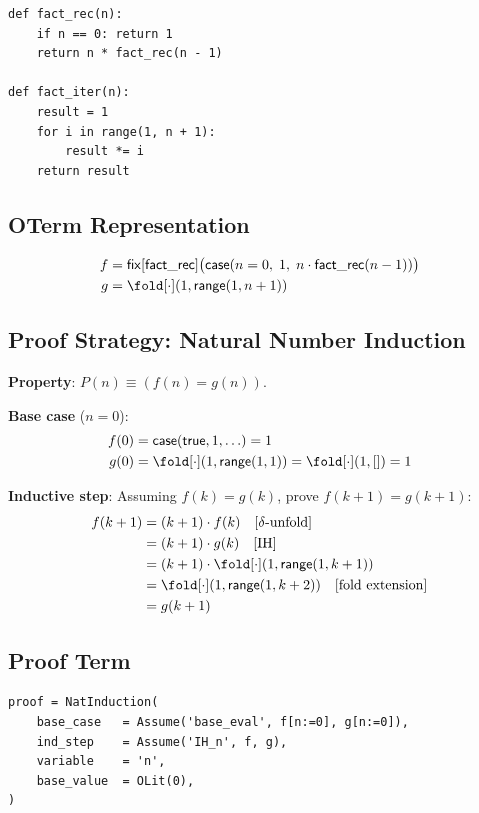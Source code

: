 \begin{lstlisting}
def fact_rec(n):
    if n == 0: return 1
    return n * fact_rec(n - 1)

def fact_iter(n):
    result = 1
    for i in range(1, n + 1):
        result *= i
    return result
\end{lstlisting}

\subsection{OTerm Representation}

\begin{align*}
f &= \mathsf{fix}[\mathsf{fact\_rec}]\big(
  \mathsf{case}(n = 0,\; 1,\; n \cdot \mathsf{fact\_rec}(n-1))\big) \\
g &= \fold[{\cdot}](1, \mathsf{range}(1, n+1))
\end{align*}

\subsection{Proof Strategy: Natural Number Induction}

\textbf{Property}: $P(n) \equiv (f(n) = g(n))$.

\textbf{Base case} ($n = 0$):
\begin{align*}
f(0) &= \mathsf{case}(\mathsf{true}, 1, \ldots) = 1 \\
g(0) &= \fold[{\cdot}](1, \mathsf{range}(1, 1)) = \fold[{\cdot}](1, []) = 1
\end{align*}

\textbf{Inductive step}: Assuming $f(k) = g(k)$, prove $f(k+1) = g(k+1)$:
\begin{align*}
f(k+1) &= (k+1) \cdot f(k) \quad [\delta\text{-unfold}] \\
        &= (k+1) \cdot g(k) \quad [\text{IH}] \\
        &= (k+1) \cdot \fold[{\cdot}](1, \mathsf{range}(1, k+1)) \\
        &= \fold[{\cdot}](1, \mathsf{range}(1, k+2)) \quad [\text{fold extension}] \\
        &= g(k+1)
\end{align*}

\subsection{Proof Term}
\begin{lstlisting}
proof = NatInduction(
    base_case   = Assume('base_eval', f[n:=0], g[n:=0]),
    ind_step    = Assume('IH_n', f, g),
    variable    = 'n',
    base_value  = OLit(0),
)
\end{lstlisting}



